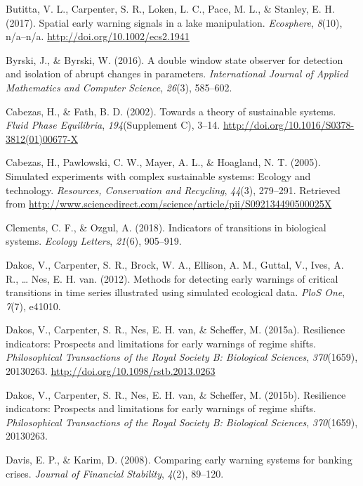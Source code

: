 \documentclass[12pt,twoside,openany]{reedthesis}
\begin{document}
\hypertarget{ref-butitta_spatial_2017}{}
Butitta, V. L., Carpenter, S. R., Loken, L. C., Pace, M. L., \& Stanley,
E. H. (2017). Spatial early warning signals in a lake manipulation.
\emph{Ecosphere}, \emph{8}(10), n/a--n/a.
\url{http://doi.org/10.1002/ecs2.1941}

\hypertarget{ref-byrski2016double}{}
Byrski, J., \& Byrski, W. (2016). A double window state observer for
detection and isolation of abrupt changes in parameters.
\emph{International Journal of Applied Mathematics and Computer
Science}, \emph{26}(3), 585--602.

\hypertarget{ref-cabezas_towards_2002}{}
Cabezas, H., \& Fath, B. D. (2002). Towards a theory of sustainable
systems. \emph{Fluid Phase Equilibria}, \emph{194}(Supplement C), 3--14.
\url{http://doi.org/10.1016/S0378-3812(01)00677-X}

\hypertarget{ref-cabezas_simulated_2005}{}
Cabezas, H., Pawlowski, C. W., Mayer, A. L., \& Hoagland, N. T. (2005).
Simulated experiments with complex sustainable systems: Ecology and
technology. \emph{Resources, Conservation and Recycling}, \emph{44}(3),
279--291. Retrieved from
\url{http://www.sciencedirect.com/science/article/pii/S092134490500025X}

\hypertarget{ref-clements2018indicators}{}
Clements, C. F., \& Ozgul, A. (2018). Indicators of transitions in
biological systems. \emph{Ecology Letters}, \emph{21}(6), 905--919.

\hypertarget{ref-dakos_methods_2012}{}
Dakos, V., Carpenter, S. R., Brock, W. A., Ellison, A. M., Guttal, V.,
Ives, A. R., \ldots{} Nes, E. H. van. (2012). Methods for detecting
early warnings of critical transitions in time series illustrated using
simulated ecological data. \emph{PloS One}, \emph{7}(7), e41010.

\hypertarget{ref-dakos_resilience_2015}{}
Dakos, V., Carpenter, S. R., Nes, E. H. van, \& Scheffer, M. (2015a).
Resilience indicators: Prospects and limitations for early warnings of
regime shifts. \emph{Philosophical Transactions of the Royal Society B:
Biological Sciences}, \emph{370}(1659), 20130263.
\url{http://doi.org/10.1098/rstb.2013.0263}

\hypertarget{ref-dakos2015resilience}{}
Dakos, V., Carpenter, S. R., Nes, E. H. van, \& Scheffer, M. (2015b).
Resilience indicators: Prospects and limitations for early warnings of
regime shifts. \emph{Philosophical Transactions of the Royal Society B:
Biological Sciences}, \emph{370}(1659), 20130263.

\hypertarget{ref-davis_comparing_2008}{}
Davis, E. P., \& Karim, D. (2008). Comparing early warning systems for
banking crises. \emph{Journal of Financial Stability}, \emph{4}(2),
89--120.
\end{document}

